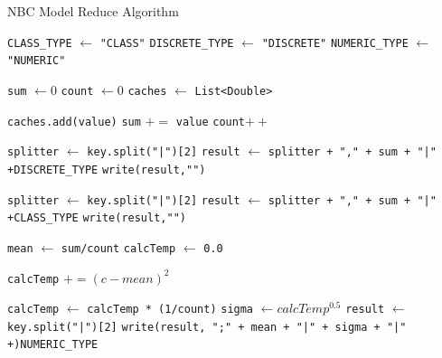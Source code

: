 \begin{enumerate}
	
\begin{algorithm}[H]
\caption{NBC Model Reduce Algorithm}\label{alg:NBCGenReduce}
\begin{algorithmic}[1]

\State \verb|CLASS_TYPE| $\gets$ \texttt{"CLASS"}
\State \verb|DISCRETE_TYPE| $\gets$ \texttt{"DISCRETE"}
\State \verb|NUMERIC_TYPE| $\gets$ \texttt{"NUMERIC"}

\State \texttt{sum} $\gets 0$
\State \texttt{count} $\gets 0$
\State \texttt{caches} $\gets$ \texttt{List<Double>}

	\State \texttt{caches.add(value)}
	\State \texttt{sum} $+=$ \texttt{value}
	\State \texttt{count}$++$
\EndFor


\State \texttt{splitter} $\gets$ \texttt{key.split("|")[2]}
\State \texttt{result} $\gets$ \texttt{splitter + "," + sum + "|" +}\verb|DISCRETE_TYPE|
\State \texttt{write(result,"")}


\State \texttt{splitter} $\gets$ \texttt{key.split("|")[2]}
\State \texttt{result} $\gets$ \texttt{splitter + "," + sum + "|" +}\verb|CLASS_TYPE|
\State \texttt{write(result,"")}


\State \texttt{mean} $\gets$ \texttt{sum/count}
\State \texttt{calcTemp} $\gets$ \texttt{0.0}

	\State \texttt{calcTemp} $+= (c - mean)^2$
\EndFor

\State \texttt{calcTemp} $\gets$ \texttt{calcTemp * (1/count)}
\State \texttt{sigma} $\gets calcTemp^{0.5}$
\State \texttt{result} $\gets$  \texttt{key.split("|")[2]}
\State \texttt{write(result, ";" + mean + "|" + sigma + "|" +)}\verb|NUMERIC_TYPE|

\EndIf

\EndProcedure
\end{algorithmic}
\end{algorithm}


\end{enumerate}
